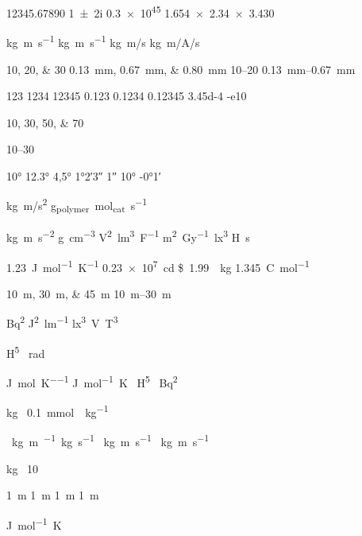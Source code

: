 
\num{12345,67890}
\num{1+-2i}
\num{.3e45}
\num{1.654 x 2.34 x 3.430}

\si{kg.m.s^{-1}}
\si{\kilogram\metre\per\second}
\si[per-mode=symbol]{\kilogram\metre\per\second}
\si[per-mode=symbol]{\kilogram\metre\per\ampere\per\second}

\numlist{10;20;30}
\SIlist{0.13;0.67;0.80}{\milli\metre}
\numrange{10}{20}
\SIrange{0.13}{0.67}{\milli\metre}


\num{123}
\num{1234}
\num{12345}
\num{0.123}
\num{0,1234}
\num{.12345}
\num{3.45d-4}
\num{-e10}

\numlist{10;30;50;70}

\numrange{10}{30}

\ang{10}
\ang{12.3}
\ang{4,5}
\ang{1;2;3}
\ang{;;1}
\ang{+10;;}
\ang{-0;1;}


\si{kg.m/s^2}
\si{g_{polymer}~mol_{cat}.s^{-1}}
    
\si{\kilo\gram\metre\per\square\second}
\si{\gram\per\cubic\centi\metre}
\si{\square\volt\cubic\lumen\per\farad}
\si{\metre\squared\per\gray\cubic\lux}
\si{\henry\second}

\SI[mode=text]{1.23}{J.mol^{-1}.K^{-1}}
\SI{.23e7}{\candela}
\SI[per-mode=symbol]{1.99}[\$]{\per\kilogram}   
\SI[per-mode=fraction]{1,345}{\coulomb\per\mole}

\SIlist{10;30;45}{\metre}    
\SIrange{10}{30}{\metre}    


\si{\square\becquerel}
\si{\joule\squared\per\lumen}   
\si{\cubic\lux\volt\tesla\cubed} 

\si{\henry\tothe{5}}
\si{\radian}

\si{\joule\per\mole\per\kelvin}    
\si{\joule\per\mole\kelvin}    
\si{\per\henry\tothe{5}}    
\si{\per\square\becquerel}

\si{\kilogram{}}
\SI[qualifier-mode = brackets]{0.1}{\milli\mole{}\per\kilogram{}}

\si[per-mode = fraction]{\cancel\kilogram\metre\per\cancel\kilogram\per\second}
\si{\kilogram\metre\per\second}
\si[unit-color = purple]{\kilogram\metre\per\second}

\si{\kilo}
\si{\micro}
\si[prefixes-as-symbols = false]{\kilo}

\si{\kilo\gram\micro}
\SI{10}{\micro}


\SI[color=red,unit-color=blue]{1}{\metre}
\SI[unit-color=blue,color=red]{1}{\metre}
\SI[color=red,unit-color=blue,number-color=green]{1}{\metre}
\SI[unit-color=blue,color=red,number-color=green]{1}{\metre}


\si[sticky-per=true]{\joule\per\mole\kelvin}
